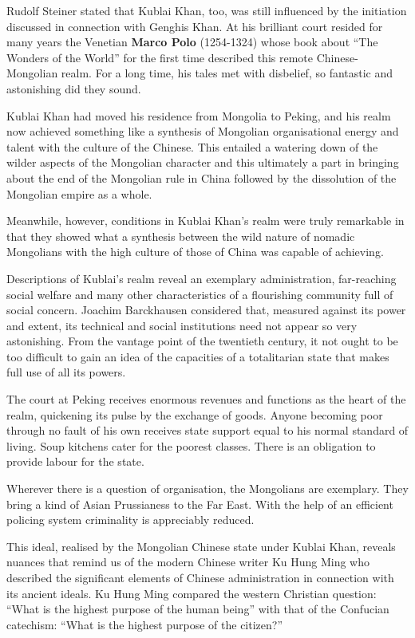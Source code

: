 Rudolf Steiner stated that Kublai Khan, too, was still influenced by the initiation discussed in connection with Genghis Khan. At his brilliant court resided for many years the Venetian \textbf{Marco Polo} (1254-1324) whose book about ``The Wonders of the World'' for the first time described this remote Chinese-Mongolian realm. For a long time, his tales met with disbelief, so fantastic and astonishing did they sound.

Kublai Khan had moved his residence from Mongolia to Peking, and his realm now achieved something like a synthesis of Mongolian organisational energy and talent with the culture of the Chinese. This entailed a watering down of the wilder aspects of the Mongolian character and this ultimately a part in bringing about the end of the Mongolian rule in China followed by the dissolution of the Mongolian empire as a whole.

Meanwhile, however, conditions in Kublai Khan's realm were truly remarkable in that they showed what a synthesis between the wild nature of nomadic Mongolians with the high culture of those of China was capable of achieving.

Descriptions of Kublai's realm reveal an exemplary administration, far-reaching social welfare and many other characteristics of a flourishing community full of social concern. Joachim Barckhausen considered that, measured against its power and extent, its technical and social institutions need not appear so very astonishing. From the vantage point of the twentieth century, it not ought to be too difficult to gain an idea of the capacities of a totalitarian state that makes full use of all its powers.

The court at Peking receives enormous revenues and functions as the heart of the realm, quickening its pulse by the exchange of goods. Anyone becoming poor through no fault of his own receives state support equal to his normal standard of living. Soup kitchens cater for the poorest classes. There is an obligation to provide labour for the state.

Wherever there is a question of organisation, the Mongolians are exemplary. They bring a kind of Asian Prussianess to the Far East. With the help of an efficient policing system criminality is appreciably reduced.

This ideal, realised by the Mongolian Chinese state under Kublai Khan, reveals nuances that remind us of the modern Chinese writer Ku Hung Ming who described the significant elements of Chinese administration in connection with its ancient ideals. Ku Hung Ming compared the western Christian question: ``What is the highest purpose of the human being'' with that of the Confucian catechism: ``What is the highest purpose of the citizen?''

